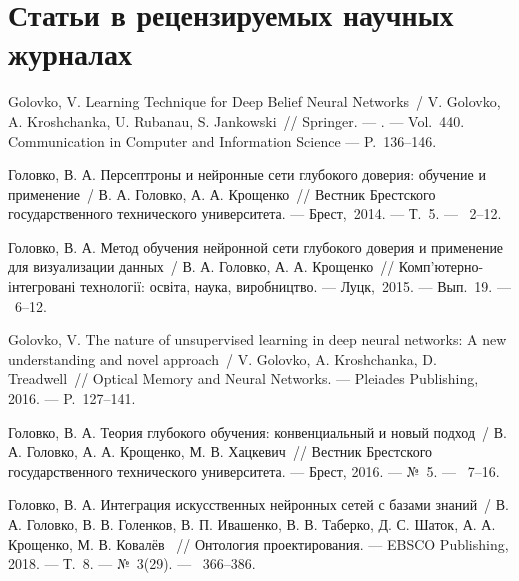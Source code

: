 \ifx\isabstract\undefined 
\section* {Статьи в рецензируемых научных журналах}
\fi

Golovko, V. Learning Technique for Deep Belief Neural Networks~/ V. Golovko, A. Kroshchanka, U. Rubanau, S. Jankowski~//
  Springer. ---
. ---
\newblock Vol.~440. Communication in Computer and Information Science ---
\newblock P.~136--146.

Головко, В. А. Персептроны и нейронные сети глубокого доверия: обучение и применение~/ В. А. Головко, А. А. Крощенко~//
  Вестник Брестского государственного технического университета. ---
\newblock Брест,~2014. ---
\newblock Т.~5. ---
~2--12.

Головко, В. А. Метод обучения нейронной сети глубокого доверия и применение для визуализации данных~/ В. А. Головко, А. А. Крощенко~//
  Комп'ютерно-інтегровані технології: освіта, наука, виробництво. ---
\newblock Луцк,~2015. ---
\newblock Вып.~19. ---
~6--12.

Golovko, V. The nature of unsupervised learning in deep neural networks: A new understanding and novel approach~/ V. Golovko, A. Kroshchanka, D. Treadwell~//
  Optical Memory and Neural Networks. ---
\newblock Pleiades Publishing, 2016. ---
\newblock P.~127--141.

Головко, В. А. Теория глубокого обучения: конвенциальный и новый подход~/ В. А. Головко, А. А. Крощенко, М. В. Хацкевич~//
  Вестник Брестского государственного технического университета. ---
\newblock Брест, 2016. ---
\newblock №~5. ---
~7--16.

Головко, В. А. Интеграция искусственных нейронных сетей с базами знаний~/ В. А. Головко, В. В. Голенков, В. П. Ивашенко, В. В. Таберко, Д. С. Шаток, А. А. Крощенко, М. В. Ковалёв ~//
  Онтология проектирования. ---
\newblock EBSCO Publishing, 2018. ---
\newblock Т.~8. ---
\newblock №~3(29). ---
~366--386.

